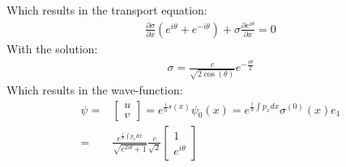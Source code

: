 			Which results in the transport equation:
			\begin{gather}
				\frac{\partial\sigma}{\partial x}\left(e^{i\theta}+e^{-i\theta}\right)+\sigma\frac{\partial e^{i\theta}}{\partial x}=0
			\end{gather}
			With the solution:
			\begin{gather}
				\sigma=\frac{c}{\sqrt{2\cos(\theta)}}e^{-\frac{i\theta}{2}}
			\end{gather}
			Which results in the wave-function:
			\begin{align}
				\psi=&
				\left[\begin{array}{cc}
					u\\
					v
				\end{array}\right]
				= e^{\frac{i}{h}s\left(x\right)}\psi_{0}\left(x\right)=e^{\frac{i}{h}\int p_{x}dx}\sigma^{\left(0\right)}\left(x\right)e_{1}\\
				=&\frac{e^{\frac{i}{h}\int p_{x}dx}}{\sqrt{e^{2i\theta}+1}}\frac{c}{\sqrt{2}}
				\left[\begin{array}{cc}
					1\\
					e^{i\theta}
				\end{array}\right]
			\end{align}
